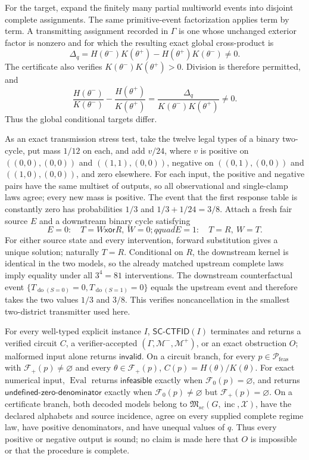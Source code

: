 For the target, expand the finitely many partial multiworld events into disjoint complete assignments.  The same primitive-event factorization applies term by term.  A transmitting assignment recorded in \(\Gamma\) is one whose unchanged exterior factor is nonzero and for which the resulting exact global cross-product is
\[
 \Delta_q=H(\theta^-)K(\theta^+)-H(\theta^+)K(\theta^-)\ne0.
\]
The certificate also verifies \(K(\theta^-)K(\theta^+)>0\).  Division is therefore permitted, and
\[
 \frac{H(\theta^-)}{K(\theta^-)}-\frac{H(\theta^+)}{K(\theta^+)}
 =\frac{\Delta_q}{K(\theta^-)K(\theta^+)}\ne0.
\]
Thus the global conditional targets differ.

As an exact transmission stress test, take the twelve legal types of a binary two-cycle, put mass \(1/12\) on each, and add \(v/24\), where \(v\) is positive on \(((0,0),(0,0))\) and \(((1,1),(0,0))\), negative on \(((0,1),(0,0))\) and \(((1,0),(0,0))\), and zero elsewhere.  For each input, the positive and negative pairs have the same multiset of outputs, so all observational and single-clamp laws agree; every new mass is positive.  The event that the first response table is constantly zero has probabilities \(1/3\) and \(1/3+1/24=3/8\).  Attach a fresh fair source \(E\) and a downstream binary cycle satisfying
\[
 E=0:\quad T=W\mathbin{\mathsf{xor}}R,\ W=0;qquad
 E=1:\quad T=R,\ W=T.
\]
For either source state and every intervention, forward substitution gives a unique solution; naturally \(T=R\).  Conditional on \(R\), the downstream kernel is identical in the two models, so the already matched upstream complete laws imply equality under all \(3^4=81\) interventions.  The downstream counterfactual event \(\{T_{\operatorname{do}(S=0)}=0,T_{\operatorname{do}(S=1)}=0\}\) equals the upstream event and therefore takes the two values \(1/3\) and \(3/8\).  This verifies noncancellation in the smallest two-district transmitter used here.

For every well-typed explicit instance \(I\), \(\mathsf{SC\mbox{-}CTFID}(I)\) terminates and returns a verified circuit \(C\), a verifier-accepted \((\Gamma,\mathcal M^-,\mathcal M^+)\), or an exact obstruction \(O\); malformed input alone returns \(\mathsf{invalid}\).  On a circuit branch, for every \(p\in\mathcal P_{\mathrm{feas}}\) with \(\mathcal F_+(p)\ne\varnothing\) and every \(\theta\in\mathcal F_+(p)\), \(C(p)=H(\theta)/K(\theta)\).  For exact numerical input, \(\operatorname{Eval}\) returns \(\mathsf{infeasible}\) exactly when \(\mathcal F_0(p)=\varnothing\), and returns \(\mathsf{undefined\mbox{-}zero\mbox{-}denominator}\) exactly when \(\mathcal F_0(p)\ne\varnothing\) but \(\mathcal F_+(p)=\varnothing\).  On a certificate branch, both decoded models belong to \(\mathfrak M_{sc}(G,\operatorname{inc},\mathcal X)\), have the declared alphabets and source incidence, agree on every supplied complete regime law, have positive denominators, and have unequal values of \(q\).  Thus every positive or negative output is sound; no claim is made here that \(O\) is impossible or that the procedure is complete.

